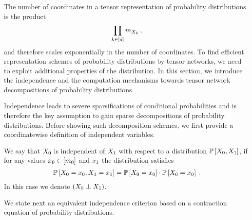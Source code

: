 
The number of coordinates in a tensor representation of probability distributions is the product
\begin{align*}
    \prod_{k\in[d]}m_{X_{k}} \, ,
\end{align*}
and therefore scales exponentially in the number of coordinates.
To find efficient representation schemes of probability distributions by tensor networks, we need to exploit additional properties of the distribution.
In this section, we introduce the independence and the computation mechanisms towards tensor network decompositions of probability distributions.


Independence leads to severe sparsifications of conditional probabilities and is therefore the key assumption to gain sparse decompositions of probability distributions.
Before showing such decomposition schemes, we first provide a coordinatewise definition of independent variables.

\begin{definition}[Independence]
    \label{def:independence}
    We say that $X_{0}$ is independent of $X_{1}$ with respect to a distribution $\mathbb{P}\left[X_{0},X_{1}\right]$, if for any values $x_{0}\in[m_{0}]$ and $x_{1}$ the distribution satisfies
    \begin{align*}
        \mathbb{P}\left[X_{0}=x_{0},X_{1}=x_{1}\right]
        = \mathbb{P}\left[X_{0}=x_{0}\right]\cdot\mathbb{P}\left[X_{0}=x_{0}\right] \, .
    \end{align*}
    In this case we denote $\left(X_{0}\perp X_{1}\right)$.
\end{definition}

We state next an equivalent independence criterion based on a contraction equation of probability distributions.

